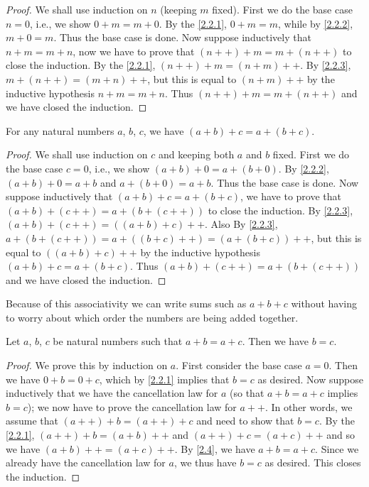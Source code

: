 \begin{proof}
  We shall use induction on \(n\) (keeping \(m\) fixed).
  First we do the base case \(n = 0\), i.e., we show \(0 + m = m + 0\).
  By the \cref{2.2.1}, \(0 + m = m\), while by \cref{2.2.2}, \(m + 0 = m\).
  Thus the base case is done.
  Now suppose inductively that \(n + m = m + n\), now we have to prove that \((n++) + m = m + (n++)\) to close the induction.
  By the \cref{2.2.1}, \((n++) + m = (n + m)++\).
  By \cref{2.2.3}, \(m + (n++) = (m + n)++\), but this is equal to \((n + m)++\) by the inductive hypothesis \(n+m=m+n\).
  Thus \((n++) + m = m + (n++)\) and we have closed the induction.
\end{proof}

\begin{proposition}\label{2.2.5}
  For any natural numbers \(a\), \(b\), \(c\), we have \((a + b) + c = a + (b + c)\).
\end{proposition}

\begin{proof}
  We shall use induction on \(c\) and keeping both \(a\) and \(b\) fixed.
  First we do the base case \(c = 0\), i.e., we show \((a + b) + 0 = a + (b + 0)\).
  By \cref{2.2.2}, \((a + b) + 0 = a + b\) and \(a + (b + 0) = a + b\).
  Thus the base case is done.
  Now suppose inductively that \((a + b) + c = a + (b + c)\), we have to prove that \((a + b) + (c++) = a + (b + (c++))\) to close the induction.
  By \cref{2.2.3}, \((a + b) + (c++) = ((a + b) + c)++\).
  Also By \cref{2.2.3}, \(a + (b + (c++)) = a + ((b + c)++) = (a + (b + c))++\), but this is equal to \(((a + b) + c)++\) by the inductive hypothesis \((a + b) + c = a + (b + c)\).
  Thus \((a + b) + (c++) = a + (b + (c++))\) and we have closed the induction.
\end{proof}

\begin{note}
  Because of this associativity we can write sums such as \(a + b + c\) without having to worry about which order the numbers are being added together.
\end{note}

\begin{proposition}\label{2.2.6}
  Let \(a\), \(b\), \(c\) be natural numbers such that \(a + b = a + c\).
  Then we have \(b = c\).
\end{proposition}

\begin{proof}
  We prove this by induction on \(a\).
  First consider the base case \(a = 0\).
  Then we have \(0 + b = 0 + c\), which by \cref{2.2.1} implies that \(b = c\) as desired.
  Now suppose inductively that we have the cancellation law for \(a\) (so that \(a + b = a + c\) implies \(b = c\));
  we now have to prove the cancellation law for \(a++\).
  In other words, we assume that \((a++) + b = (a++) + c\) and need to show that \(b = c\).
  By the \cref{2.2.1}, \((a++) + b = (a + b)++\) and \((a++) + c = (a + c)++\) and so we have \((a + b)++ = (a + c)++\).
  By \cref{2.4}, we have \(a + b = a + c\).
  Since we already have the cancellation law for \(a\), we thus have \(b = c\) as desired.
  This closes the induction.
\end{proof}

